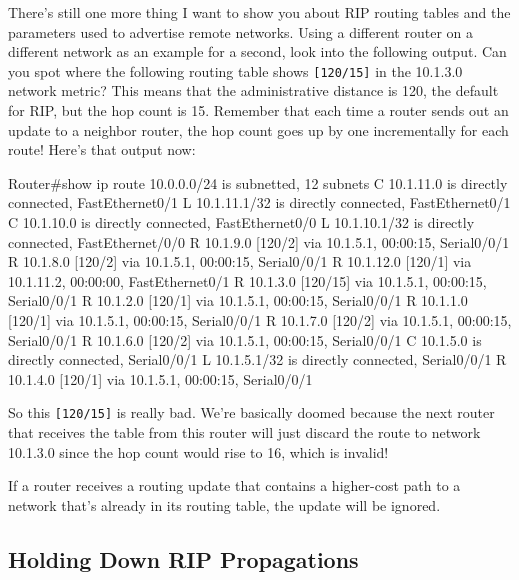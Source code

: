 There's still one more thing I want to show you about RIP routing tables
and the parameters used to advertise remote networks. Using a different
router on a different network as an example for a second, look into the
following output. Can you spot where the following routing table shows
\texttt{{[}120/15{]}} in the 10.1.3.0 network metric? This means that
the administrative distance is 120, the default for RIP, but the hop
count is 15. Remember that each time a router sends out an update to a
neighbor router, the hop count goes up by one incrementally for each
route! Here's that output now:

\begin{cli}
Router#show ip route
     10.0.0.0/24 is subnetted, 12 subnets
C       10.1.11.0 is directly connected, FastEthernet0/1
L       10.1.11.1/32 is directly connected, FastEthernet0/1
C       10.1.10.0 is directly connected, FastEthernet0/0
L       10.1.10.1/32 is directly connected, FastEthernet/0/0
R       10.1.9.0 [120/2] via 10.1.5.1, 00:00:15, Serial0/0/1
R       10.1.8.0 [120/2] via 10.1.5.1, 00:00:15, Serial0/0/1
R       10.1.12.0 [120/1] via 10.1.11.2, 00:00:00, FastEthernet0/1
R      10.1.3.0 [120/15] via 10.1.5.1, 00:00:15, Serial0/0/1
R       10.1.2.0 [120/1] via 10.1.5.1, 00:00:15, Serial0/0/1
R       10.1.1.0 [120/1] via 10.1.5.1, 00:00:15, Serial0/0/1
R       10.1.7.0 [120/2] via 10.1.5.1, 00:00:15, Serial0/0/1
R       10.1.6.0 [120/2] via 10.1.5.1, 00:00:15, Serial0/0/1
C       10.1.5.0 is directly connected, Serial0/0/1
L       10.1.5.1/32 is directly connected, Serial0/0/1
R       10.1.4.0 [120/1] via 10.1.5.1, 00:00:15, Serial0/0/1
\end{cli}

So this \texttt{{[}120/15{]}} is really bad. We're basically doomed
because the next router that receives the table from this router will
just discard the route to network 10.1.3.0 since the hop count would
rise to 16, which is invalid!

\begin{note}
If a router receives a routing update that contains a higher-cost path to a network that's already in its routing table, the update will be ignored.
\end{note}

\subsection[Holding Down RIP
Propagations]{\texorpdfstring{\protect\hypertarget{c09.xhtmlux5cux23c09-sec-16}{}{}Holding
Down RIP Propagations}{Holding Down RIP Propagations}}

